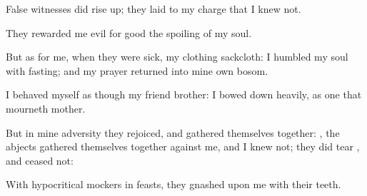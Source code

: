 {\Q {}False
witnesses did rise
up; they laid to my
charge
{} that I
knew not.


\par }{\Q {}They
rewarded me
evil for
good
{} the
spoiling of my
soul.


\par }{\Q {}But as for me, when they were
sick, my
clothing
{}
sackcloth: I
humbled my
soul with
fasting; and my
prayer
returned into mine own
bosom.


\par }{\Q {}I
behaved myself as though
{} my
friend
{}
brother: I bowed
down
heavily, as one that
mourneth
{}
mother.


\par }{\Q {}But in mine
adversity they
rejoiced, and gathered themselves
together:
{}, the
abjects gathered themselves
together against me, and I
knew
{} not; they did
tear
{}, and
ceased not:


\par }{\Q {}With
hypocritical
mockers in
feasts, they
gnashed upon me with their
teeth.


\par }{\BB \par }
